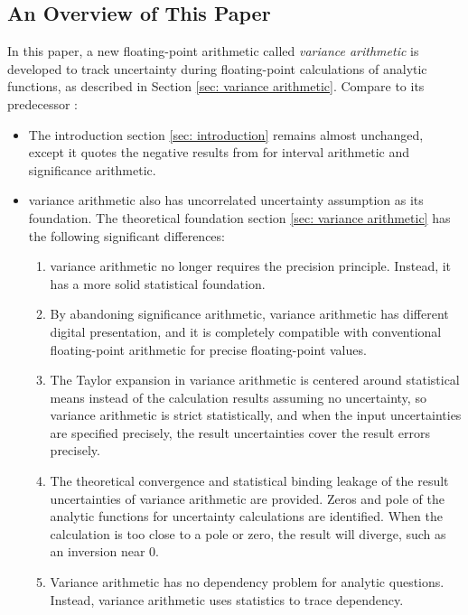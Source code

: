 \documentclass[twoside]{article}
\numberwithin{equation}{section}
\begin{document}
\subsection{ An Overview of This Paper}

In this paper, a new floating-point arithmetic called \emph{variance arithmetic} is developed to track uncertainty during floating-point calculations of analytic functions, as described in Section \ref{sec: variance arithmetic}. 
Compare to its predecessor \cite{Prev_Precision_Arithmetic}:
 \begin{itemize}
\item The introduction section \ref{sec: introduction} remains almost unchanged, except it quotes the negative results from \cite{Prev_Precision_Arithmetic} for interval arithmetic and significance arithmetic.

\item variance arithmetic also has uncorrelated uncertainty assumption as its foundation.
The theoretical foundation section \ref{sec: variance arithmetic} has the following significant differences:

\begin{enumerate}
\item variance arithmetic no longer requires the precision principle.  
Instead, it has a more solid statistical foundation. 

\item By abandoning significance arithmetic, variance arithmetic has different digital presentation, and it is completely compatible with conventional floating-point arithmetic for precise floating-point values.

\item The Taylor expansion in variance arithmetic is centered around statistical means instead of the calculation results assuming no uncertainty, so variance arithmetic is strict statistically, and when the input uncertainties are specified precisely, the result uncertainties cover the result errors precisely.

\item The theoretical convergence and statistical binding leakage of the result uncertainties of variance arithmetic are provided.
Zeros and pole of the analytic functions for uncertainty calculations are identified.
When the calculation is too close to a pole or zero, the result will diverge, such as an inversion near $0$.

\item Variance arithmetic has no dependency problem for analytic questions.
Instead, variance arithmetic uses statistics to trace dependency.
\end{enumerate}


\end{itemize}
\end{document}
